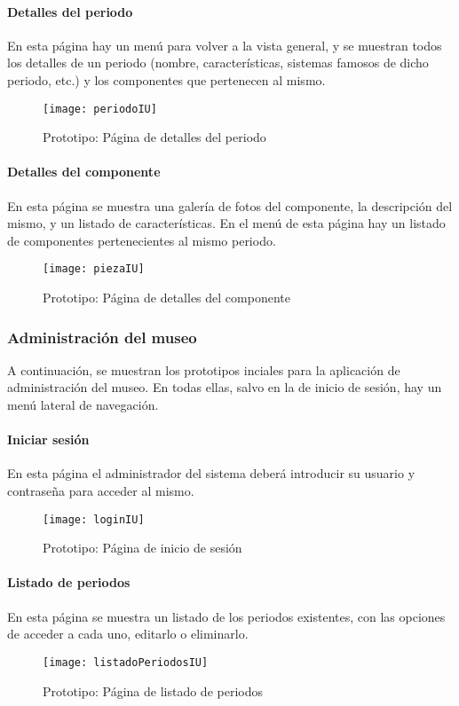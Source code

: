 \paragraph*{Detalles del periodo}
En esta página hay un menú para volver a la vista general, y se muestran todos los detalles de un periodo (nombre, características, sistemas famosos de dicho periodo, etc.) y los componentes que pertenecen al mismo. 
\begin{figure}[H]
\centering
\texttt{[image: periodoIU]}
\caption{Prototipo: Página de detalles del periodo}
\end{figure}
\paragraph*{Detalles del componente}
En esta página se muestra una galería de fotos del componente, la descripción del mismo, y un listado de características. En el menú de esta página hay un listado de componentes pertenecientes al mismo periodo.
\begin{figure}[H]
\centering
\texttt{[image: piezaIU]}
\caption{Prototipo: Página de detalles del componente}
\end{figure}

\subsubsection{Administración del museo}
A continuación, se muestran los prototipos inciales para la aplicación de administración del museo. En todas ellas, salvo en la de inicio de sesión, hay un menú lateral de navegación. 
\paragraph*{Iniciar sesión}
En esta página el administrador del sistema deberá introducir su usuario y contraseña para acceder al mismo.
\begin{figure}[H]
\centering
\texttt{[image: loginIU]}
\caption{Prototipo: Página de inicio de sesión}
\end{figure}
\paragraph*{Listado de periodos}
En esta página se muestra un listado de los periodos existentes, con las opciones de acceder a cada uno, editarlo o eliminarlo.
\begin{figure}[H]
\centering
\texttt{[image: listadoPeriodosIU]}
\caption{Prototipo: Página de listado de periodos}
\end{figure}
